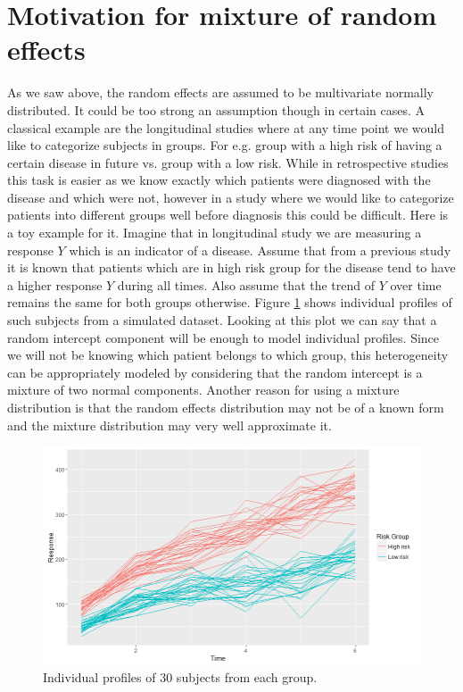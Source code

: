 \section{Motivation for mixture of random effects}
As we saw above, the random effects are assumed to be multivariate normally distributed. It could be too strong an assumption though in certain cases. A classical example are the longitudinal studies where at any time point we would like to categorize subjects in groups. For e.g. group with a high risk of having a certain disease in future vs. group with a low risk. While in retrospective studies this task is easier as we know exactly which patients were diagnosed with the disease and which were not, however in a study where we would like to categorize patients into different groups well before diagnosis this could be difficult. Here is a toy example for it. Imagine that in longitudinal study we are measuring a response $Y$ which is an indicator of a disease. Assume that from a previous study it is known that patients which are in high risk group for the disease tend to have a higher response $Y$ during all times. Also assume that the trend of $Y$ over time remains the same for both groups otherwise. Figure \ref{fig : random_slope_dummy_data} shows individual profiles of such subjects from a simulated dataset. Looking at this plot we can say that a random intercept component will be enough to model individual profiles. Since we will not be knowing which patient belongs to which group, this heterogeneity can be appropriately modeled by considering that the random intercept is a mixture of two normal components. Another reason for using a mixture distribution is that the random effects distribution may not be of a known form and the mixture distribution may very well approximate it.\\

\begin{figure}
	\centering
	\includegraphics[scale=0.5]{mainmatter/chapter_3_blmm/random_slope_dummy_data.png}
	\caption{Individual profiles of 30 subjects from each group.}
	\label{fig : random_slope_dummy_data}
\end{figure}

